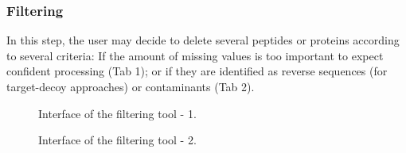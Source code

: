 \documentclass[12pt]{article}
\begin{document}
\subsubsection{Filtering}\label{sec:filtering}
{In this step, the user may decide to delete several peptides or proteins according to several criteria:
If the amount of missing values is too important to expect confident processing (Tab 1); or if they are identified as reverse sequences (for target-decoy approaches) or contaminants (Tab 2).}

\begin {figure}
\centering
{}
\caption{Interface of the filtering tool - 1.}\label{fig:filter1}
\end {figure}

\begin {figure}
\centering
{}
\caption{Interface of the filtering tool - 2.}\label{fig:filter2}
\end {figure}
\end{document}
